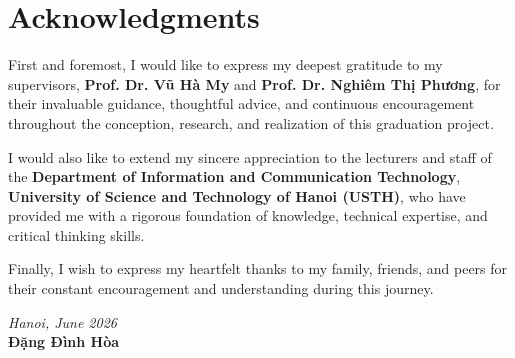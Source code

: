 \chapter*{Acknowledgments}

First and foremost, I would like to express my deepest gratitude to my supervisors, \textbf{Prof. Dr. Vũ Hà My} and \textbf{Prof. Dr. Nghiêm Thị Phương}, for their invaluable guidance, thoughtful advice, and continuous encouragement throughout the conception, research, and realization of this graduation project.

I would also like to extend my sincere appreciation to the lecturers and staff of the \textbf{Department of Information and Communication Technology}, \textbf{University of Science and Technology of Hanoi (USTH)}, who have provided me with a rigorous foundation of knowledge, technical expertise, and critical thinking skills.

Finally, I wish to express my heartfelt thanks to my family, friends, and peers for their constant encouragement and understanding during this journey.

\vspace{10mm}
\begin{flushright}
\textit{Hanoi, June 2026}\\[3mm]
\textbf{Đặng Đình Hòa}
\end{flushright}
